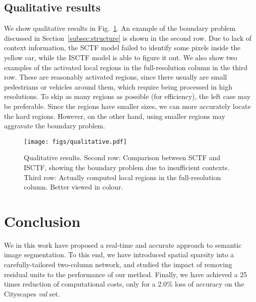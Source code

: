 \documentclass[10pt,twocolumn,letterpaper]{article}
\begin{document}
%
\subsection{Qualitative results}
We show qualitative results in Fig.~\ref{fig:qualitative}.
An example of the boundary problem discussed in Section~\ref{subsec:structure} is shown in the second row.
Due to lack of context information, the SCTF model failed to identify some pixels inside the yellow car,
while the ISCTF model is able to figure it out.
We also show two examples of the activated local regions in the full-resolution column in the third row.
These are reasonably activated regions,
since there usually are small pedestrians or vehicles around them,
which require being processed in high resolutions.
To skip as many regions as possible (for efficiency), the left case may be preferable.
Since the regions have smaller sizes,
we can more accurately locate the hard regions.
%
However, on the other hand, using smaller regions may aggravate the boundary problem.

\begin{figure}[t]
\begin{center}
\texttt{[image: figs/qualitative.pdf]}
\end{center}
\caption{
Qualitative results.
Second row: Comparison between SCTF and ISCTF, showing the boundary problem due to insufficient contexts.
Third row: Actually computed local regions in the full-resolution column.
Better viewed in colour.
}
\label{fig:qualitative}
\vspace{-4.0mm}
\end{figure}


%
\section{Conclusion}
We in this work have proposed a real-time and accurate approach to semantic image segmentation.
To this end, we have introduced spatial sparsity into a carefully-tailored two-column network,
and studied the impact of removing residual units to the performance of our method.
Finally, we have achieved a 25 times reduction of computational costs, only for a 2.0\% loss of accuracy on the Cityscapes \textit{val} set.


{\small


}
\end{document}
